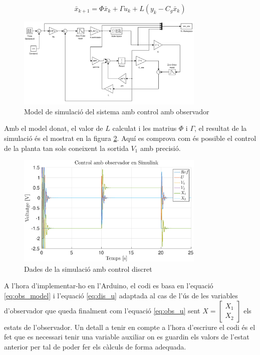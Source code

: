 \documentclass[12pt,a4paper,final,twoside,openright]{report}
\begin{document}
\begin{equation}\label{eq:obs_model}
\bar{x}_{k+1} = \Phi \bar{x}_k + \Gamma u_k + L (y_k - C_g \bar{x}_k)
\end{equation}

\begin{figure}
\centering
\includegraphics[width=0.8\textwidth]{Imatges/obs_sim_scheme.pdf}
\caption{Model de simulació del sistema amb control amb observador\label{fig:obs_sim_scheme}}
\end{figure}

Amb el model donat, el valor de $L$ calculat i les matrius $\Phi$ i $\Gamma$, el resultat de la simulació és el mostrat en la figura \ref{fig:obs_all_sim}. Aquí es comprova com és possible el control de la planta tan sols coneixent la sortida $V_1$ amb precisió.

\begin{figure}[h]
\centering
\includegraphics[width=0.8\textwidth]{Imatges/obs_all_sim.eps}
\caption{Dades de la simulació amb control discret\label{fig:obs_all_sim}}
\end{figure}

A l'hora d'implementar-ho en l'Arduino, el codi es basa en l'equació \eqref{eq:obs_model} i l'equació \eqref{eq:dis_u} adaptada al cas de l'ús de les variables d'observador que queda finalment com l'equació \eqref{eq:obs_u} sent $X=\begin{bmatrix}
X_1\\
X_2
\end{bmatrix}$ els estats de l'observador. Un detall a tenir en compte a l'hora d'escriure el codi és el fet que es necessari tenir una variable auxiliar on es guardin els valors de l'estat anterior per tal de poder fer els càlculs de forma adequada.
\end{document}

